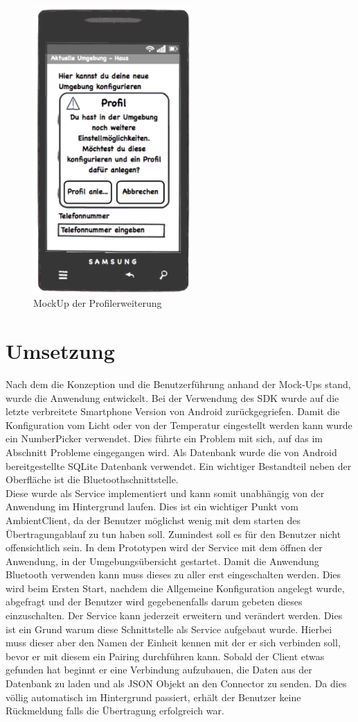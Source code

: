 \begin{figure}[H]
\includegraphics[width=6cm]{MockUps/Erweiterung}
\caption{MockUp der Profilerweiterung}
\end{figure}

\section{Umsetzung} 
Nach dem die Konzeption und die Benutzerführung anhand der Mock-Ups stand, wurde die Anwendung entwickelt. Bei der Verwendung des SDK wurde auf die letzte verbreitete Smartphone Version von Android zurückgegriefen. Damit die Konfiguration vom Licht oder von der Temperatur eingestellt werden kann wurde ein NumberPicker verwendet. Dies führte ein Problem mit sich, auf das im Abschnitt Probleme eingegangen wird. Als Datenbank wurde die von Android bereitgestellte SQLite Datenbank verwendet. Ein wichtiger Bestandteil neben der Oberfläche ist die Bluetoothschnittstelle. \\
Diese wurde als Service implementiert und kann somit unabhängig von der Anwendung im Hintergrund laufen. Dies ist ein wichtiger Punkt vom AmbientClient, da der Benutzer möglichst wenig mit dem starten des Übertragungablauf zu tun haben soll. Zumindest soll es für den Benutzer nicht offensichtlich sein. In dem Prototypen wird der Service mit dem öffnen der Anwendung, in der Umgebungsübersicht gestartet. Damit die Anwendung Bluetooth verwenden kann muss dieses zu aller erst eingeschalten werden. Dies wird beim Ersten Start, nachdem die Allgemeine Konfiguration angelegt wurde, abgefragt und der Benutzer wird gegebenenfalls darum gebeten dieses einzuschalten. Der Service kann jederzeit erweitern und verändert werden. Dies ist ein Grund warum diese Schnittstelle als Service aufgebaut wurde. Hierbei muss dieser aber den Namen der Einheit kennen mit der er sich verbinden soll, bevor er mit diesem ein Pairing durchführen kann. Sobald der Client etwas gefunden hat beginnt er eine Verbindung aufzubauen, die Daten aus der Datenbank zu laden und als JSON Objekt an den Connector zu senden. Da dies völlig automatisch im Hintergrund passiert, erhält der Benutzer keine Rückmeldung falls die Übertragung erfolgreich war.

